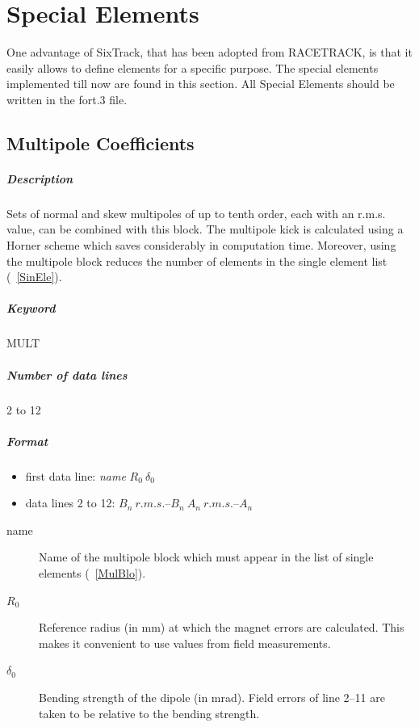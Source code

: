 \documentclass[a4paper,11pt]{report}
\begin{document}
\section{Special Elements}

One advantage of SixTrack, that has been adopted from RACETRACK, is
that it easily allows to define elements for a specific purpose. The
special elements implemented till now are found in this section.
All Special Elements should be written in the fort.3 file.

\subsection{Multipole Coefficients} \label{MulCoe}

\subparagraph{Description}

Sets of normal and skew multipoles of up to tenth order, each with an
r.m.s. value, can be combined with this block. The multipole kick is
calculated using a Horner scheme which saves considerably in
computation time. Moreover, using the multipole block reduces the
number of elements in the single element list (~\ref{SinEle}).

\subparagraph{Keyword} MULT \subparagraph{Number of data lines} 2 to
12

\subparagraph{Format}
\begin{itemize}
\item first data line: {\em name} \/$ R_{0}\ \delta_{0} $
\item data lines 2 to 12: $ B_{n}\ r.m.s.$--$B_{n}\ A_{n}\ r.m.s.$--$A_{n} $
\end{itemize}

\begin{description}
\item [name] Name of the multipole block which must appear in the list
  of single elements (~\ref{MulBlo}).
\item [$ R_{0} $] Reference radius (in mm) at which the magnet errors
  are calculated.  This makes it convenient to use values from field
  measurements.
\item [$ \delta_{0} $] Bending strength of the dipole (in mrad). Field
  errors of line 2--11 are taken to be relative to the bending
  strength.
\end{description}
\end{document}
